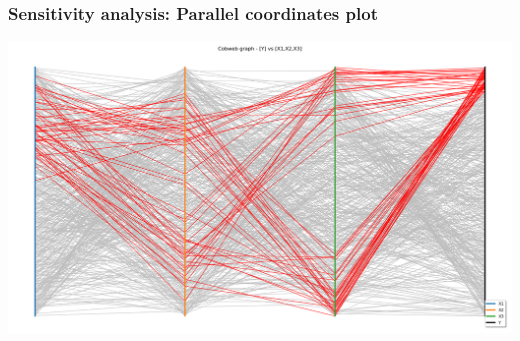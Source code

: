 \documentclass{beamer}
\begin{document}



\begin{frame}
\frametitle{Sensitivity analysis: Parallel coordinates plot}

\centering
\includegraphics[width=.8\textwidth]{figures/CobwebOT.png}


\end{frame}
\end{document}

